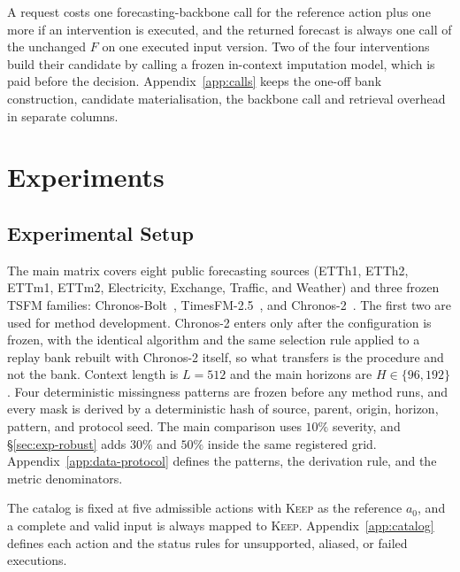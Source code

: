 \documentclass{article}
\newcommand{\tsfm}{TSFM}
\begin{document}
A request costs one forecasting-backbone call for the reference action plus one more if an
intervention is executed, and the returned forecast is always one call of the unchanged $F$ on
one executed input version. Two of the four interventions build their candidate by calling a
frozen in-context imputation model, which is paid before the decision.
Appendix~\ref{app:calls} keeps the one-off bank construction, candidate materialisation, the
backbone call and retrieval overhead in separate columns.

\section{Experiments}
\label{sec:exp}

\subsection{Experimental Setup}
\label{sec:exp-setup}
The main matrix covers eight public forecasting sources (ETTh1, ETTh2, ETTm1, ETTm2,
Electricity, Exchange, Traffic, and Weather) and three frozen \tsfm{} families:
Chronos-Bolt~\citep{chronosbolt2025}, TimesFM-2.5~\citep{das2024timesfm}, and
Chronos-2~\citep{chronos2_2025}. The first two are used for method development. Chronos-2
enters only after the configuration is frozen, with the identical algorithm and the same
selection rule applied to a replay bank rebuilt with Chronos-2 itself, so what transfers is the
procedure and not the bank.
Context length is $L = 512$ and the main horizons are $H \in \{96, 192\}$. Four deterministic
missingness patterns are frozen before any method runs, and every mask is derived by a
deterministic hash of source, parent, origin, horizon, pattern, and protocol seed. The main
comparison uses $10\%$ severity, and \S\ref{sec:exp-robust} adds $30\%$ and $50\%$ inside the
same registered grid. Appendix~\ref{app:data-protocol} defines the patterns, the derivation
rule, and the metric denominators.

The catalog is fixed at five admissible actions with \textsc{Keep} as the reference $a_0$, and
a complete and valid input is always mapped to \textsc{Keep}. Appendix~\ref{app:catalog}
defines each action and the status rules for unsupported, aliased, or failed executions.
\end{document}
